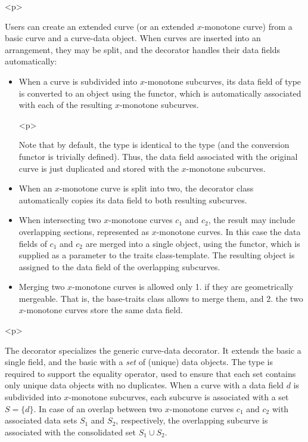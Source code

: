 \begin{ccHtmlOnly}<p>\end{ccHtmlOnly}
Users can create an extended curve (or an extended $x$-monotone
curve) from a basic curve and a curve-data object. When curves are
inserted into an arrangement, they may be split, and the
decorator handles their data fields automatically:
\begin{itemize}
\item When a curve is subdivided into $x$-monotone subcurves, its
data field of type  is converted to an 
object using the  functor, which is automatically associated
with each of the resulting $x$-monotone subcurves.

\begin{ccHtmlOnly}<p>\end{ccHtmlOnly}
Note that by default, the  type is identical to the
 type (and the conversion functor 
is trivially defined). Thus, the data field associated with the original
curve is just duplicated and stored with the $x$-monotone subcurves.
%
\item When an $x$-monotone curve is split into two, the decorator
class automatically copies its data field to both resulting subcurves.
%
\item When intersecting two $x$-monotone curves $c_1$ and $c_2$, the
result may include overlapping sections, represented as
$x$-monotone curves. In this case the data fields of $c_1$ and $c_2$
are merged into a single  object,
using the  functor, which is supplied as a
parameter to the traits class-template. The resulting object is
assigned to the data field of the overlapping subcurves.
%
\item Merging two $x$-monotone curves is allowed only 1. if they are
geometrically mergeable. That is, the base-traits class allows to merge
them, and 2. the two $x$-monotone curves store the same data field.
\end{itemize}

\begin{ccHtmlOnly}<p>\end{ccHtmlOnly}
The  decorator
specializes the generic curve-data decorator. It extends the basic
 a single  field, and the basic
 with a {\em set} of (unique) data 
objects. The  type is required to support the equality operator, 
used to ensure that each set contains only unique data objects with no 
duplicates.
When a curve with a data field $d$ is subdivided into $x$-monotone subcurves,
each subcurve is associated with a set $S = \{ d \}$. In case of an overlap
between two $x$-monotone curves $c_1$ and $c_2$ with associated data sets
$S_1$ and $S_2$, respectively, the overlapping subcurve is associated with
the consolidated set $S_1 \cup S_2$.

